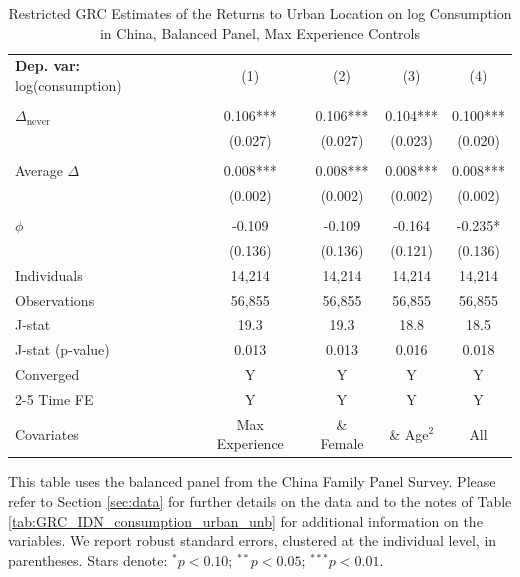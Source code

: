 \begin{table}[htbp] \centering \begin{threeparttable}
 \caption{Restricted GRC Estimates of the Returns to Urban Location on log Consumption in China, Balanced Panel, Max Experience Controls} 
 \label{tab:GRC_CHN_consumption_urban_bal_exp_max} 
\begin{tabular}{l cccc} \toprule  \textbf{Dep. var:}  log(consumption) 
                    &\multicolumn{1}{c}{(1)}   &\multicolumn{1}{c}{(2)}   &\multicolumn{1}{c}{(3)}   &\multicolumn{1}{c}{(4)}   \\
                    &               &               &               &               \\
\addlinespace
$\Delta_{\text{never}}$&       0.106***&       0.106***&       0.104***&       0.100***\\
                    &     (0.027)   &     (0.027)   &     (0.023)   &     (0.020)   \\
                    &               &               &               &               \\
\addlinespace
Average $\Delta$    &       0.008***&       0.008***&       0.008***&       0.008***\\
                    &     (0.002)   &     (0.002)   &     (0.002)   &     (0.002)   \\
                    &               &               &               &               \\
\addlinespace
$\phi$              &      -0.109   &      -0.109   &      -0.164   &      -0.235*  \\
                    &     (0.136)   &     (0.136)   &     (0.121)   &     (0.136)   \\
\addlinespace
Individuals         &      14,214   &      14,214   &      14,214   &      14,214   \\
Observations        &      56,855   &      56,855   &      56,855   &      56,855   \\
J-stat              &        19.3   &        19.3   &        18.8   &        18.5   \\
J-stat (p-value)    &       0.013   &       0.013   &       0.016   &       0.018   \\
Converged           &           Y   &           Y   &           Y   &           Y   \\
\cmidrule{2-5} Time FE & Y & Y & Y & Y \\ Covariates & Max Experience & \& Female & \& Age$^2$ & All \\ \bottomrule \end{tabular} \begin{tablenotes}[flushleft] \footnotesize \item{This table uses the balanced panel from the China Family Panel Survey. Please refer to Section \ref{sec:data} for further details on the data and to the notes of Table \ref{tab:GRC_IDN_consumption_urban_unb} for additional information on the variables. We report robust standard errors, clustered at the individual level, in parentheses. Stars denote: $^{*} p<0.10$; $^{**} p<0.05$; $^{***} p<0.01$.} \end{tablenotes} \end{threeparttable} \end{table}
